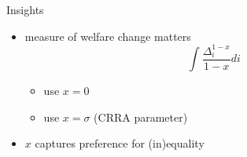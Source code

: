 \documentclass[aspectratio=169,mathserif]{beamer}
\begin{document}
\begin{frame}{Insights}
    \begin{itemize}
        \item measure of welfare change matters
        \begin{equation*}
            \int \frac{\Delta_i^{1 - x}}{1-x} di
        \end{equation*}
        \begin{itemize}
            \item \citet{guvenen2023use} use $x=0$
            \item \citet{boar2023income-or-wealth} use $x = \sigma$ (CRRA parameter) 
        \end{itemize}
        \item $x$ captures preference for (in)equality
     
    \end{itemize}
    
\end{frame}


\end{document}
